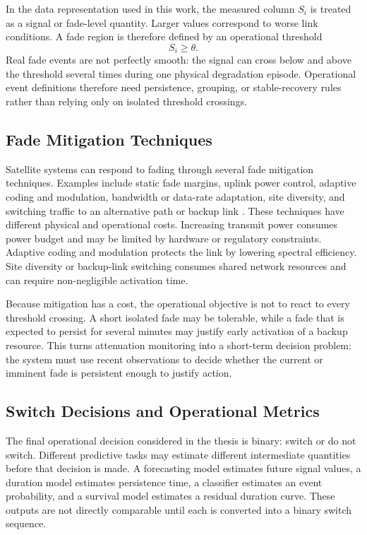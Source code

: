In the data representation used in this work, the measured column \(S_i\) is
treated as a signal or fade-level quantity. Larger values correspond to worse
link conditions. A fade region is therefore defined by an operational threshold
\[
  S_i \ge \theta .
\]
Real fade events are not perfectly smooth: the signal can cross below and above
the threshold several times during one physical degradation episode. Operational
event definitions therefore need persistence, grouping, or stable-recovery
rules rather than relying only on isolated threshold crossings.

\subsection{Fade Mitigation Techniques}

Satellite systems can respond to fading through several fade mitigation
techniques. Examples include static fade margins, uplink power control,
adaptive coding and modulation, bandwidth or data-rate adaptation, site
diversity, and switching traffic to an alternative path or backup link
\cite{panagopoulos2004satellite,ippolito2017rainFadeMitigation}. These
techniques have different physical and operational costs. Increasing transmit
power consumes power budget and may be limited by hardware or regulatory
constraints. Adaptive coding and modulation protects the link by lowering
spectral efficiency. Site diversity or backup-link switching consumes shared
network resources and can require non-negligible activation time.

Because mitigation has a cost, the operational objective is not to react to
every threshold crossing. A short isolated fade may be tolerable, while a fade
that is expected to persist for several minutes may justify early activation of
a backup resource. This turns attenuation monitoring into a short-term decision
problem: the system must use recent observations to decide whether the current
or imminent fade is persistent enough to justify action.

\subsection{Switch Decisions and Operational Metrics}
\label{sec:background-operational-evaluation}

The final operational decision considered in the thesis is binary: switch or do
not switch. Different predictive tasks may estimate different intermediate
quantities before that decision is made. A forecasting model estimates future
signal values, a duration model estimates persistence time, a classifier
estimates an event probability, and a survival model estimates a residual
duration curve. These outputs are not directly comparable until each is
converted into a binary switch sequence.

